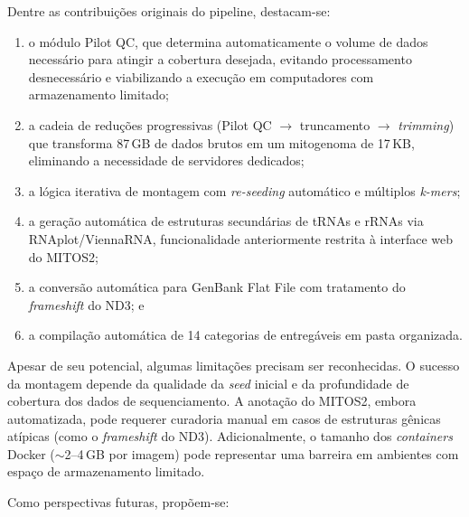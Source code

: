 Dentre as contribuições originais do pipeline, destacam-se:

\begin{enumerate}[label=(\roman*)]
    \item o módulo Pilot QC, que determina automaticamente o volume de dados necessário para atingir a cobertura desejada, evitando processamento desnecessário e viabilizando a execução em computadores com armazenamento limitado;
    \item a cadeia de reduções progressivas (Pilot QC $\rightarrow$ truncamento $\rightarrow$ \textit{trimming}) que transforma 87\,GB de dados brutos em um mitogenoma de 17\,KB, eliminando a necessidade de servidores dedicados;
    \item a lógica iterativa de montagem com \textit{re-seeding} automático e múltiplos \textit{k-mers};
    \item a geração automática de estruturas secundárias de tRNAs e rRNAs via RNAplot/ViennaRNA, funcionalidade anteriormente restrita à interface web do MITOS2;
    \item a conversão automática para GenBank Flat File com tratamento do \textit{frameshift} do ND3; e
    \item a compilação automática de 14 categorias de entregáveis em pasta organizada.
\end{enumerate}

Apesar de seu potencial, algumas limitações precisam ser reconhecidas. O sucesso da montagem depende da qualidade da \textit{seed} inicial e da profundidade de cobertura dos dados de sequenciamento. A anotação do MITOS2, embora automatizada, pode requerer curadoria manual em casos de estruturas gênicas atípicas (como o \textit{frameshift} do ND3). Adicionalmente, o tamanho dos \textit{containers} Docker ($\sim$2--4\,GB por imagem) pode representar uma barreira em ambientes com espaço de armazenamento limitado.

Como perspectivas futuras, propõem-se:

